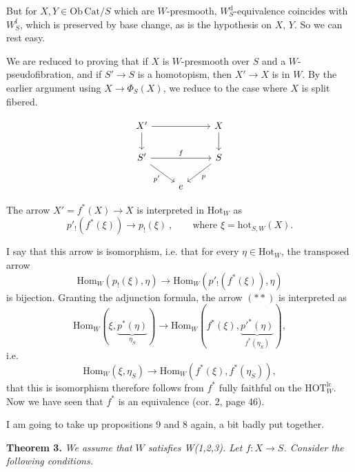 \documentclass[11pt]{article}
\newcommand{\printedpage}[1]{\marginpar{\footnotesize p.~#1}}
\newcommand{\msp}[1]{\marginpar{\footnotesize [#1]}}
\newcommand{\HOTlc}{\mathrm{HOT}^{\mathrm{lc}}_W}
\newcommand{\Hot}{\mathrm{Hot}}
\newcommand{\Hom}{\mathrm{Hom}}
\newcommand{\hot}{\mathrm{hot}}
\newcommand{\Wd}{W^{\mathrm{d}}_S}
\newcommand{\Wf}{W^{\mathrm{f}}_S}
\begin{document}
But for $X, Y \in \mathrm{Ob}\,\mathrm{Cat}/S$ which are $W$-presmooth, $\Wd$-equivalence coincides with $\Wf$, which is preserved by base change, as is the hypothesis on $X$, $Y$. So we can rest easy.

We are reduced to proving that if $X$ is $W$-presmooth over $S$ and a $W$-pseudofibration, and if $S' \longrightarrow S$ is a homotopism, then $X' \longrightarrow X$ is in $W$. By the earlier argument using $X \longrightarrow \Phi_S(X)$, we reduce to the case where $X$ is split fibered.

\printedpage{36}

\msp{page 50}
\[ \begin{tikzcd}
X' \arrow[rr] \arrow[d] & & X \arrow[d] \\
S' \arrow[rr, "f"] \arrow[dr, "p'"'] & & S \arrow[dl, "p"] \\
 & e &
\end{tikzcd} \]

The arrow $X' = f^*(X) \longrightarrow X$ is interpreted in $\Hot_W$ as
\[ p'_!(f^*(\xi)) \longrightarrow p_!(\xi) \ , \qquad \text{where } \xi = \hot_{S,W}(X). \tag*{$(*)$} \]

I say that this arrow is isomorphism, i.e. that for every $\eta \in \Hot_W$, the transposed arrow
\[ \Hom_W(p_!(\xi),\eta) \longrightarrow \Hom_W(p'_!(f^*(\xi)),\eta) \tag*{$(**)$} \]
is bijection. Granting the adjunction formula, the arrow $(**)$ is interpreted as
\[ \Hom_W(\xi,\underbrace{p^*(\eta)}_{\eta_S}) \longrightarrow \Hom_W(f^*(\xi),\underbrace{p'^*(\eta)}_{f^*(\eta_S)}), \]
i.e.
\[ \Hom_W(\xi,\eta_S) \longrightarrow \Hom_W(f^*(\xi),f^*(\eta_S)), \]
that this is isomorphism therefore follows from $f^*$ fully faithful on the $\HOTlc$. Now we have seen that $f^*$ is an equivalence (cor. 2, page 46).

\msp{page 51}
I am going to take up propositions 9 and 8 again, a bit badly put together.

\textbf{Theorem 3.} \textit{We assume that $W$ satisfies \textup{W(1,2,3)}. Let $f : X \longrightarrow S$. Consider the following conditions.}
\end{document}
